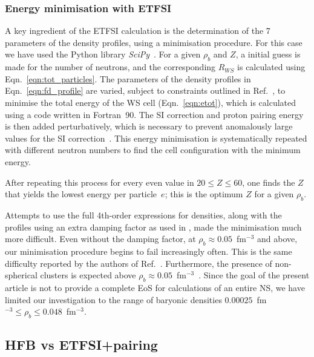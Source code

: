 \documentclass[
    amsmath,amssymb,
    aps,
    prc,
    floatfix,
]{revtex4-2}
\begin{document}
\subsubsection{Energy minimisation with ETFSI}\label{subsubsec:min}

A key ingredient of the ETFSI calculation is the determination of the 7 parameters of the density profiles, using a minimisation procedure.
For this case we have used the Python library \emph{SciPy}~\cite{scipy1.0contributorsSciPyFundamentalAlgorithms2020}. For a given $\rho_b$ and $Z$, a initial guess is made for the number of neutrons, and the corresponding $R_{WS}$ is calculated using Eqn.~\ref{eqn:tot_particles}. The parameters of the density profiles in Eqn.~\ref{eqn:fd_profile} are varied, subject to constraints outlined in Ref.~\cite{onsi2008semi}, to minimise the total energy of the WS cell (Eqn.~\ref{eqn:etot}), which is calculated using a code written in Fortran~90. The SI correction and proton pairing energy is then added perturbatively, which is necessary to prevent anomalously large values for the SI correction~\cite{pearsonInnerCrustNeutron2012}. This energy minimisation is systematically repeated with different neutron numbers to find the cell configuration with the minimum energy.

After repeating this process for every even value in $20\leq Z\leq60$, one finds the $Z$ that yields the lowest energy per particle~$e$; this is the optimum $Z$ for a given $\rho_b$. 

Attempts to use the full 4th-order expressions for densities, along with the profiles using an extra damping factor as used in \cite{onsi2008semi,pearsonInnerCrustNeutron2012,pearsonUnifiedEquationsState2018}, made the minimisation much more difficult. Even without the damping factor, at $\rho_b\approx0.05$~fm$^{-3}$ and above, our minimisation procedure begins to fail increasingly often. This is the same difficulty reported by the authors of Ref.~\cite{pearsonInnerCrustNeutron2012}. Furthermore, the presence of non-spherical clusters is expected above $\rho_b\approx0.05$~fm$^{-3}$~\cite{pearsonUnifiedEquationsState2020}. Since the goal of the present article is not to provide a complete EoS for calculations of an entire NS, we have limited our investigation to the range of baryonic densities $0.00025$~fm$^{-3}\leq\rho_b\leq0.048$~fm$^{-3}$.


\subsection{HFB vs ETFSI+pairing}
\end{document}
